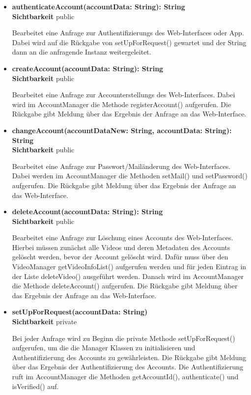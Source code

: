 \begin{itemize}
\item \textbf{authenticateAccount(accountData: String): String}\hfill\\
\textbf{Sichtbarkeit} public

Bearbeitet eine Anfrage zur Authentifizierungs des Web-Interfaces oder App. Dabei wird auf die Rückgabe von setUpForRequest() gewartet und der String dann an die anfragende Instanz weitergeleitet.

\item \textbf{createAccount(accountData: String): String}\hfill\\
\textbf{Sichtbarkeit} public

Bearbeitet eine Anfrage zur Accounterstellungs des Web-Interfaces. Dabei wird im AccountManager die Methode registerAccount() aufgerufen. Die Rückgabe gibt Meldung über das Ergebnis der Anfrage an das Web-Interface.

\item \textbf{changeAccount(accountDataNew: String, accountData: String): String}\hfill\\
\textbf{Sichtbarkeit} public

Bearbeitet eine Anfrage zur Passwort/Mailänderung des Web-Interfaces. Dabei werden im AccountManager die Methoden setMail() und setPassword()  aufgerufen. Die Rückgabe gibt Meldung über das Ergebnis der Anfrage an das Web-Interface.

\item \textbf{deleteAccount(accountData: String): String}\hfill\\
\textbf{Sichtbarkeit} public

Bearbeitet eine Anfrage zur Löschung eines Accounts des Web-Interfaces. Hierbei müssen zunächst alle Videos und deren Metadaten des Accounts gelöscht werden, bevor der Account gelöscht wird. Dafür muss über den VideoManager getVideoInfoList() aufgerufen werden und für jeden Eintrag in der Liste deleteVideo() ausgeführt werden. Danach wird im AccountManager die Methode deleteAccount() aufgerufen. Die Rückgabe gibt Meldung über das Ergebnis der Anfrage an das Web-Interface.

\item \textbf{setUpForRequest(accountData: String)}\hfill\\
\textbf{Sichtbarkeit} private

Bei jeder Anfrage wird zu Beginn die private Methode setUpForRequest() aufgerufen, um die die Manager Klassen zu initialisieren und Authentifizierung des Accounts zu gewährleisten. Die Rückgabe gibt Meldung über das Ergebnis der Authentifizierung des Accounts. Die Authentifizierung ruft im AccountManager die Methoden getAccountId(), authenticate() und isVerified() auf.

\end{itemize}